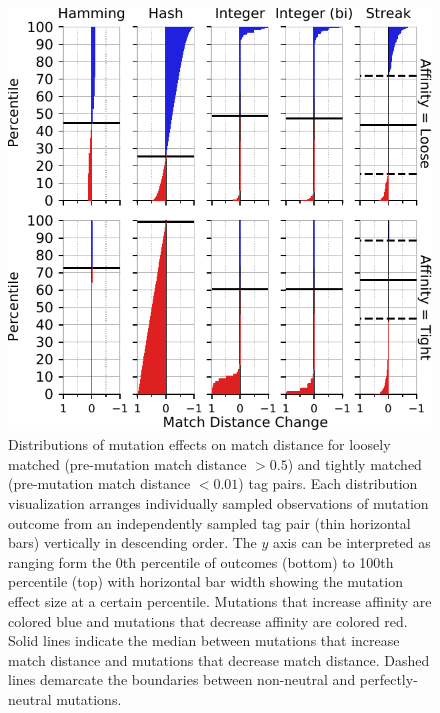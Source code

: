 \begin{figure}
\begin{center}

\includegraphics[width=\columnwidth]{img/mutational_step/bitweight=0dot5+seed=1+title=low-mutational-step+_data_hathash_hash=95a57768de56995a+_script_fullcat_hash=b9a24f3843e31e82+ext=}
\caption{
Distributions of mutation effects on match distance for loosely matched (pre-mutation match distance $> 0.5$) and tightly matched (pre-mutation match distance $< 0.01$) tag pairs.
Each distribution visualization arranges individually sampled observations of mutation outcome from an independently sampled tag pair (thin horizontal bars) vertically in descending order.
The $y$ axis can be interpreted as ranging form the 0th percentile of outcomes (bottom) to 100th percentile (top) with horizontal bar width showing the mutation effect size at a certain percentile.
Mutations that increase affinity are colored blue and mutations that decrease affinity are colored red.
Solid lines indicate the median between mutations that increase match distance and mutations that decrease match distance.
Dashed lines demarcate the boundaries between non-neutral and perfectly-neutral mutations.
}
\label{fig:mutational_step}

\end{center}
\end{figure}
